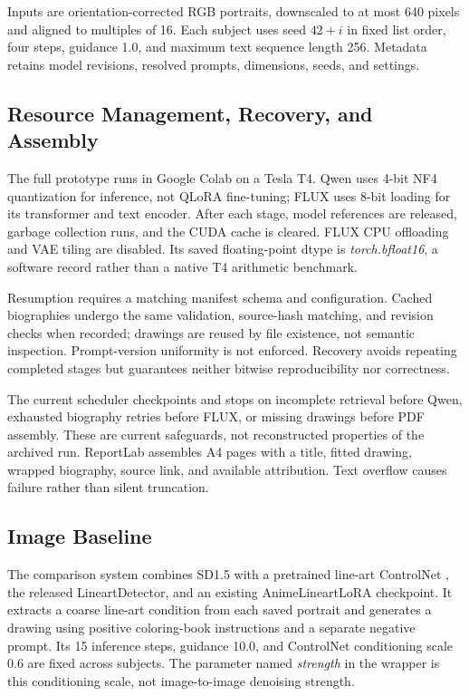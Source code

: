 \documentclass[11pt]{article}
\begin{document}
Inputs are orientation-corrected RGB portraits, downscaled to at most 640 pixels and aligned to multiples of 16. Each subject uses seed $42+i$ in fixed list order, four steps, guidance 1.0, and maximum text sequence length 256. Metadata retains model revisions, resolved prompts, dimensions, seeds, and settings.

\subsection{Resource Management, Recovery, and Assembly}

The full prototype runs in Google Colab on a Tesla T4. Qwen uses 4-bit NF4 quantization \citep{dettmers-etal-2023-qlora} for inference, not QLoRA fine-tuning; FLUX uses 8-bit loading for its transformer and text encoder. After each stage, model references are released, garbage collection runs, and the CUDA cache is cleared. FLUX CPU offloading and VAE tiling are disabled. Its saved floating-point dtype is \emph{torch.bfloat16}, a software record rather than a native T4 arithmetic benchmark.

Resumption requires a matching manifest schema and configuration. Cached biographies undergo the same validation, source-hash matching, and revision checks when recorded; drawings are reused by file existence, not semantic inspection. Prompt-version uniformity is not enforced. Recovery avoids repeating completed stages but guarantees neither bitwise reproducibility nor correctness.

The current scheduler checkpoints and stops on incomplete retrieval before Qwen, exhausted biography retries before FLUX, or missing drawings before PDF assembly. These are current safeguards, not reconstructed properties of the archived run. ReportLab assembles A4 pages with a title, fitted drawing, wrapped biography, source link, and available attribution. Text overflow causes failure rather than silent truncation.

\subsection{Image Baseline}

The comparison system combines SD1.5 with a pretrained line-art ControlNet \citep{zhang-etal-2023-controlnet}, the released LineartDetector, and an existing AnimeLineartLoRA checkpoint. It extracts a coarse line-art condition from each saved portrait and generates a drawing using positive coloring-book instructions and a separate negative prompt. Its 15 inference steps, guidance 10.0, and ControlNet conditioning scale 0.6 are fixed across subjects. The parameter named \emph{strength} in the wrapper is this conditioning scale, not image-to-image denoising strength.
\end{document}
